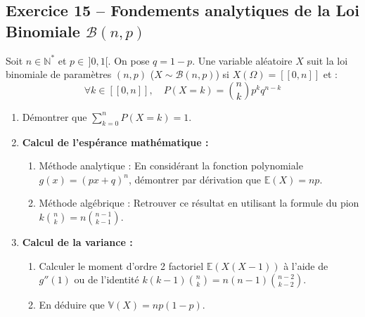 \documentclass[11pt,a4paper]{article}
\newcommand{\N}{\mathbb{N}}
\newcommand{\E}{\mathbb{E}}
\newcommand{\V}{\mathbb{V}}
\begin{document}
\vspace{0.3cm}

\subsection*{Exercice 15 -- Fondements analytiques de la Loi Binomiale $\mathcal{B}(n, p)$}

Soit $n \in \N^*$ et $p \in \,]0, 1[$. On pose $q = 1 - p$.
Une variable aléatoire $X$ suit la loi binomiale de paramètres $(n, p)$ ($X \sim \mathcal{B}(n, p)$) si $X(\Omega) = [\![0, n]\!]$ et :
\[
\forall k \in [\![0, n]\!], \quad P(X = k) = \binom{n}{k} p^k q^{n-k}
\]
\begin{enumerate}[label=\arabic*.]
    \item Démontrer que $\sum_{k=0}^n P(X = k) = 1$.
    \item \textbf{Calcul de l'espérance mathématique :}
    \begin{enumerate}
        \item Méthode analytique : En considérant la fonction polynomiale $g(x) = (px + q)^n$, démontrer par dérivation que $\E(X) = np$.
        \item Méthode algébrique : Retrouver ce résultat en utilisant la formule du pion $k \binom{n}{k} = n \binom{n-1}{k-1}$.
    \end{enumerate}
    \item \textbf{Calcul de la variance :}
    \begin{enumerate}
        \item Calculer le moment d'ordre 2 factoriel $\E(X(X-1))$ à l'aide de $g''(1)$ ou de l'identité $k(k-1)\binom{n}{k} = n(n-1)\binom{n-2}{k-2}$.
        \item En déduire que $\V(X) = np(1-p)$.
    \end{enumerate}
\end{enumerate}
\end{document}
